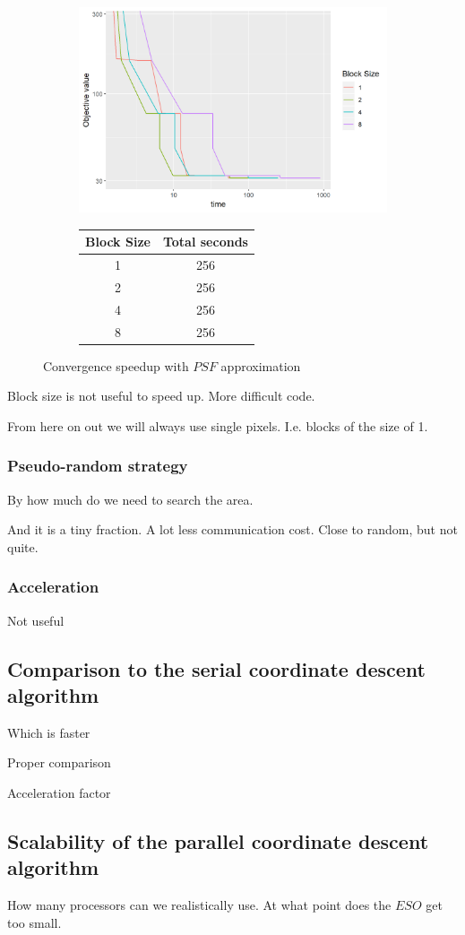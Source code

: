 \begin{figure}[h]
	\centering
	\begin{subfigure}{0.6\linewidth}
		\includegraphics[width=1.0\linewidth]{./chapters/05.pcdm/parameters/blockSize.png}
	\end{subfigure}
	\begin{subfigure}{0.35\linewidth}
		\begin{tabular}{c | c}
			Block Size & Total seconds \\ \hline
			1 & 256 \\
			2 & 256 \\
			4 & 256 \\
			8 & 256 \\
		\end{tabular}
	\end{subfigure}
	\caption{Convergence speedup with $PSF$ approximation}
\end{figure}
Block size is not useful to speed up. More difficult code.

From here on out we will always use single pixels. I.e. blocks of the size of 1.

 

\subsubsection{Pseudo-random strategy}
By how much do we need to search the area.

And it is a tiny fraction. A lot less communication cost. Close to random, but not quite.


\subsubsection{Acceleration}
Not useful


\subsection{Comparison to the serial coordinate descent algorithm}
Which is faster

Proper comparison

Acceleration factor


\subsection{Scalability of the parallel coordinate descent algorithm}
How many processors can we realistically use. At what point does the $ESO$ get too small.





